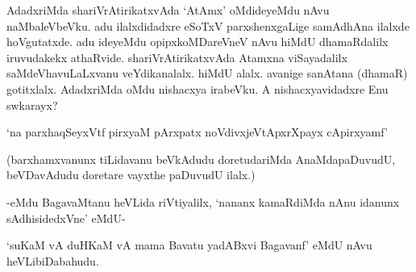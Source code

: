 AdadxriMda shariVrAtirikatxvAda `AtAmx' oMdideyeMdu nAvu naMbaleVbeVku. adu ilalxdidadxre eSoTxV parxshenxgaLige samAdhAna ilalxde hoVgutatxde. adu ideyeMdu opipxkoMDareVneV nAvu hiMdU dhamaRdalilx iruvudakekx athaRvide. shariVrAtirikatxvAda Atamxna viSayadalilx saMdeVhavuLaLxvanu veYdikanalalx. hiMdU alalx. avanige sanAtana (dhamaR) gotitxlalx. AdadxriMda oMdu nishacxya irabeVku. A nishacxyavidadxre Enu swkarayx?

\begin{shloka}
`na parxhaqSeyxVtf pirxyaM pArxpatx noVdivxjeVtApxrXpayx cApirxyamf'
\end{shloka}

(barxhamxvanunx tiLidavanu beVkAdudu doretudariMda AnaMdapaDuvudU, beVDavAdudu doretare vayxthe paDuvudU ilalx.)

-eMdu BagavaMtanu heVLida riVtiyalilx, `nananx kamaRdiMda nAnu idanunx sAdhisidedxVne' eMdU-

`suKaM vA duHKaM vA mama Bavatu yadABxvi Bagavanf' eMdU nAvu heVLibiDabahudu.

